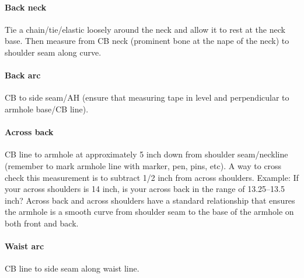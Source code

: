 \documentclass{article}
\begin{document}
\paragraph{Back neck} Tie a chain/tie/elastic loosely around the neck and allow it to rest at the neck base. Then measure from CB neck (prominent bone at the nape of the neck) to shoulder seam along curve.

\paragraph{Back arc} CB to side seam/AH (ensure that measuring tape in level and perpendicular to armhole base/CB line).

\paragraph{Across back} CB line to armhole at approximately 5 inch down from shoulder seam/neckline (remember to mark armhole line with marker, pen, pins, etc). A way to cross check this measurement is to subtract 1/2 inch from across shoulders. Example: If your across shoulders is 14 inch, is your across back in the range of 13.25--13.5 inch? Across back and across shoulders have a standard relationship that ensures the armhole is a smooth curve from shoulder seam to the base of the armhole on both front and back.

\paragraph{Waist arc} CB line to side seam along waist line.
\end{document}

